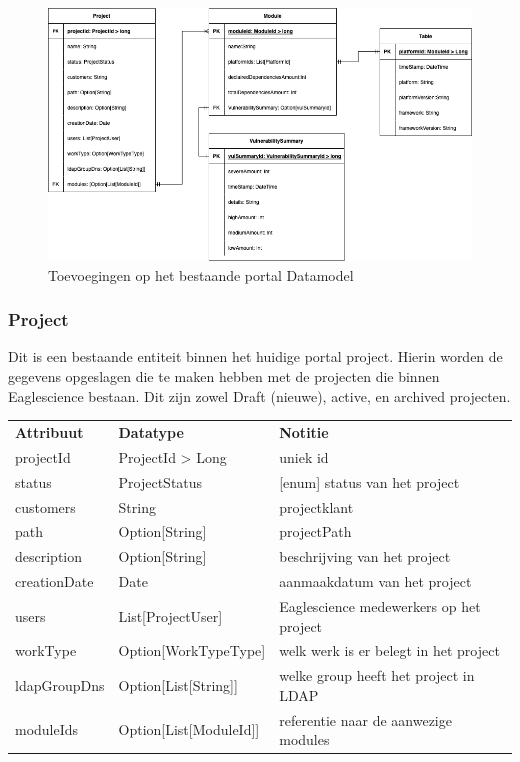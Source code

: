 \begin{figure}[bth]
    \myfloatalign
    \includegraphics[width=15cm]{gfx/SOUPAPI-PortalDM}
    \caption{Toevoegingen op het bestaande portal Datamodel}
    \label{fig:SOUP-portalDm}
\end{figure}
\clearpage
\subsubsection{Project}\label{subsubsec:portalProject}
Dit is een bestaande entiteit binnen het huidige portal project. Hierin worden de gegevens opgeslagen die te maken hebben met de projecten die binnen Eaglescience bestaan. Dit zijn zowel Draft (nieuwe), active, en archived projecten.

\begin{tabular}{lll}
    \textbf{Attribuut} & \textbf{Datatype} & \textbf{Notitie}\\
    projectId & ProjectId > Long & uniek id\\
    status & ProjectStatus & [enum] status van het project\\
    customers & String & projectklant\\
    path & Option[String] & projectPath\\
    description & Option[String] & beschrijving van het project\\
    creationDate & Date & aanmaakdatum van het project \\
    users & List[ProjectUser] & Eaglescience medewerkers op het project \\
    workType & Option[WorkTypeType] & welk werk is er belegt in het project   \\
    ldapGroupDns & Option[List[String]] & welke group heeft het project in LDAP  \\
    moduleIds & Option[List[ModuleId]] & referentie naar de aanwezige modules  \\
\end{tabular}


